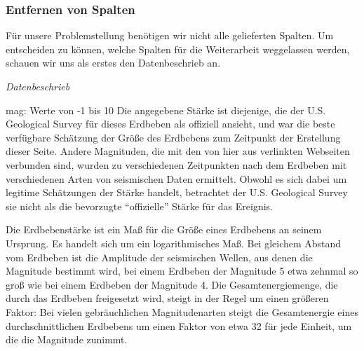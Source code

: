 \documentclass[
]{article}
\begin{document}
\hypertarget{entfernen-von-spalten}{%
\subsubsection{Entfernen von Spalten}\label{entfernen-von-spalten}}

Für unsere Problemstellung benötigen wir nicht alle gelieferten Spalten.
Um entscheiden zu können, welche Spalten für die Weiterarbeit
weggelassen werden, schauen wir uns als erstes den Datenbeschrieb an.

\emph{Datenbeschrieb}

mag: Werte von -1 bis 10 Die angegebene Stärke ist diejenige, die der
U.S. Geological Survey für dieses Erdbeben als offiziell ansieht, und
war die beste verfügbare Schätzung der Größe des Erdbebens zum Zeitpunkt
der Erstellung dieser Seite. Andere Magnituden, die mit den von hier aus
verlinkten Webseiten verbunden sind, wurden zu verschiedenen Zeitpunkten
nach dem Erdbeben mit verschiedenen Arten von seismischen Daten
ermittelt. Obwohl es sich dabei um legitime Schätzungen der Stärke
handelt, betrachtet der U.S. Geological Survey sie nicht als die
bevorzugte ``offizielle'' Stärke für das Ereignis.

Die Erdbebenstärke ist ein Maß für die Größe eines Erdbebens an seinem
Ursprung. Es handelt sich um ein logarithmisches Maß. Bei gleichem
Abstand vom Erdbeben ist die Amplitude der seismischen Wellen, aus denen
die Magnitude bestimmt wird, bei einem Erdbeben der Magnitude 5 etwa
zehnmal so groß wie bei einem Erdbeben der Magnitude 4. Die
Gesamtenergiemenge, die durch das Erdbeben freigesetzt wird, steigt in
der Regel um einen größeren Faktor: Bei vielen gebräuchlichen
Magnitudenarten steigt die Gesamtenergie eines durchschnittlichen
Erdbebens um einen Faktor von etwa 32 für jede Einheit, um die die
Magnitude zunimmt.
\end{document}
